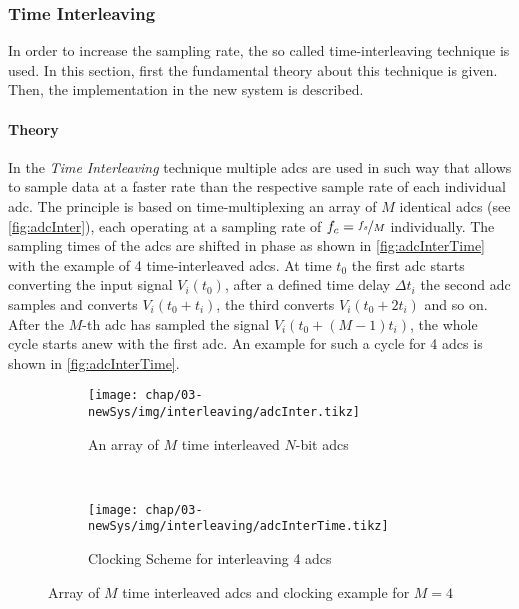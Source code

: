 \subsubsection{Time Interleaving}\label{sssec:time-interleaving}
In order to increase the sampling rate, the so called time-interleaving technique is used.
In this section, first the fundamental theory about this technique is given.
Then, the implementation in the new system is described.

\paragraph{Theory}
In the \textit{Time Interleaving} technique multiple \glspl{adc} are used in such way that allows to sample data at a faster rate than the respective sample rate of each individual \gls{adc}. 
The principle is based on time-multiplexing an array of $M$ identical \glspl{adc} (see \autoref{fig:adcInter}), each operating at a sampling rate of $f_c = \nicefrac{f_s}{M}$ individually. 
The sampling times of the \glspl{adc} are shifted in phase as shown in \autoref{fig:adcInterTime} with the example of 4 time-interleaved \glspl{adc}.  
At time $t_0$ the first \gls{adc} starts converting the input signal $V_i(t_0)$, after a defined time delay $\Delta t_i$ the second \gls{adc} samples and converts $V_i(t_0 + t_i)$, the third converts $V_i(t_0 + 2t_i)$ and so on. 
After the $M$-th \gls{adc} has sampled the signal $V_i(t_0 + (M-1)t_i)$, the whole cycle starts anew with the first \gls{adc}. \cite{mangrob}
An example for such a cycle for 4 \glspl{adc} is shown in \autoref{fig:adcInterTime}.

\begin{figure}[H]
	\centering
	\begin{subfigure}{\textwidth}
		\centering
		\texttt{[image: chap/03-newSys/img/interleaving/adcInter.tikz]}  
		\caption{An array of $M$ time interleaved $N$-bit \glspl{adc} \cite{mangrob}}
		\label{fig:adcInter}
	\end{subfigure}
	\\[4ex]
	\begin{subfigure}{\textwidth}
		\centering
		\tikzexternaldisable
		\texttt{[image: chap/03-newSys/img/interleaving/adcInterTime.tikz]}  
		\caption{Clocking Scheme for interleaving 4 \glspl{adc}}
		\tikzexternalenable
		\label{fig:adcInterTime}
	\end{subfigure}
	\caption[Time-Interleaving Method]{Array of $M$ time interleaved \glspl{adc} and clocking example for $M = 4$}
	\label{fig:interleaving}
\end{figure}

